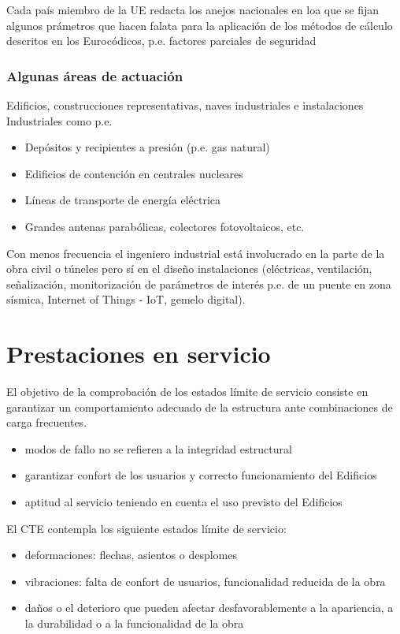 Cada país miembro de la UE redacta los anejos nacionales en loa que se fijan algunos prámetros que hacen falata para la aplicación de los métodos de cálculo descritos en los Eurocódicos, p.e. factores parciales de seguridad

\subsubsection{Algunas áreas de actuación}

Edificios, construcciones representativas, naves industriales e instalaciones Industriales como p.e.
\begin{itemize}
    \item Depósitos y recipientes a presión (p.e. gas natural)
    \item Edificios de contención en centrales nucleares
    \item Líneas de transporte de energía eléctrica
    \item Grandes antenas parabólicas, colectores fotovoltaicos, etc.
\end{itemize}

Con menos frecuencia el ingeniero industrial está involucrado en la parte de la obra civil o túneles pero sí en el diseño instalaciones (eléctricas, ventilación, señalización, monitorización de parámetros de interés p.e. de un puente en zona sísmica, Internet of Things - IoT, gemelo digital).

\section{Prestaciones en servicio}

El objetivo de la comprobación de los estados límite de servicio consiste en garantizar un comportamiento adecuado de la estructura ante combinaciones de carga frecuentes.

\begin{itemize}
    \item modos de fallo no se refieren a la integridad estructural
    \item garantizar confort de los usuarios y correcto funcionamiento del Edificios
    \item aptitud al servicio teniendo en cuenta el uso previsto del Edificios
\end{itemize}

El CTE contempla los siguiente estados límite de servicio:
\begin{itemize}
    \item deformaciones: flechas, asientos o desplomes
    \item vibraciones: falta de confort de usuarios, funcionalidad reducida de la obra
    \item daños o el deterioro que pueden afectar desfavorablemente a la apariencia, a la durabilidad o a la funcionalidad de la obra
\end{itemize}

